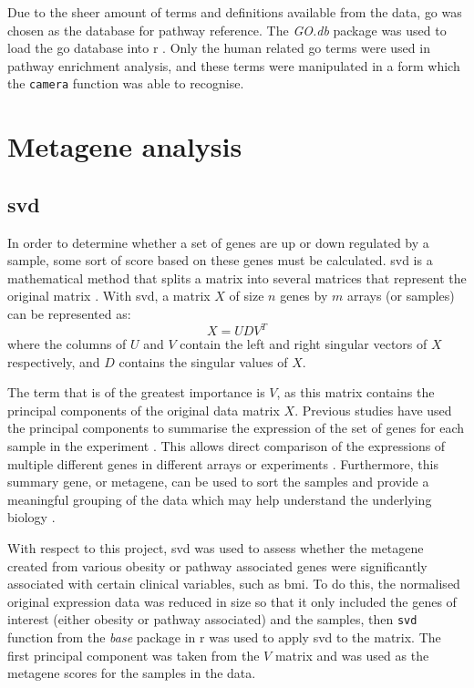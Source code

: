 Due to the sheer amount of terms and definitions available from the data, \gls{go} was chosen as the database for pathway reference.
The \textit{GO.db} package was used to load the \gls{go} database into \gls{r} \citep{Carlson2016}.
Only the human related \gls{go} terms were used in pathway enrichment analysis, and these terms were manipulated in a form which the \texttt{camera} function was able to recognise.

\section{Metagene analysis}
\label{sec:metagene_analysis}

\subsection{\Gls{svd}}
\label{sub:svd}

In order to determine whether a set of genes are up or down regulated by a sample, some sort of score based on these genes must be calculated.
\Gls{svd} is a mathematical method that splits a matrix into several matrices that represent the original matrix \citep{Golub1970}.
With \gls{svd}, a matrix $X$ of size $n$ genes by $m$ arrays (or samples) can be represented as:
\begin{equation}
	\label{eq:svd}
	X = UDV^T
\end{equation}
where the columns of $U$ and $V$ contain the left and right singular vectors of $X$ respectively, and $D$ contains the singular values of $X$.

The term that is of the greatest importance is $V$, as this matrix contains the principal components of the original data matrix $X$.
Previous studies have used the principal components to summarise the expression of the set of genes for each sample in the experiment \citep{Alter2000,West2001}.
This allows direct comparison of the expressions of multiple different genes in different arrays or experiments \citep{Alter2000}.
Furthermore, this summary gene, or metagene, can be used to sort the samples and provide a meaningful grouping of the data which may help understand the underlying biology \citep{Alter2000}.

With respect to this project, \gls{svd} was used to assess whether the metagene created from various obesity or pathway associated genes were significantly associated with certain clinical variables, such as \gls{bmi}.
To do this, the normalised original expression data was reduced in size so that it only included the genes of interest (either obesity or pathway associated) and the samples, then \texttt{svd} function from the \textit{base} package in \gls{r} was used to apply \gls{svd} to the matrix.
The first principal component was taken from the $V$ matrix and was used as the metagene scores for the samples in the data.

